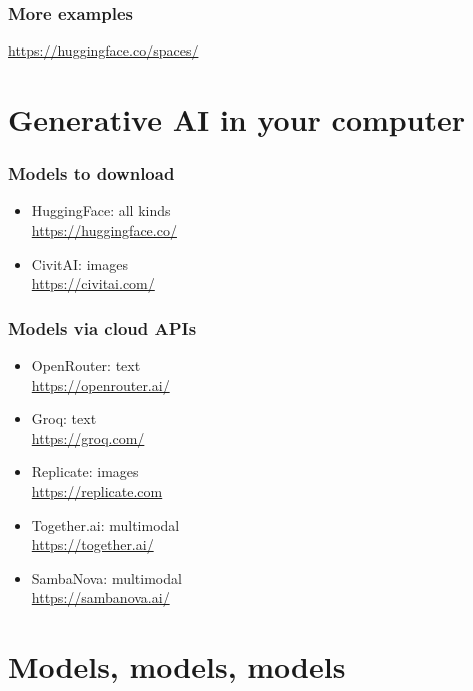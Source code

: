 \documentclass[17pt,aspectratio=169,hyperref={pdfusetitle,colorlinks,allcolors=olive}]{beamer}
\begin{document}
\begin{frame}[fragile]
\frametitle{More examples}

\begin{flushright}
  {
    \url{https://huggingface.co/spaces/}
  }
\end{flushright}
\end{frame}

\section{Generative AI in your computer}

\begin{frame}[fragile]
\frametitle{Models to download}

\begin{itemize}
\item HuggingFace: all kinds \\
  \url{https://huggingface.co/}
\item CivitAI: images \\
  \url{https://civitai.com/}
\end{itemize}
\end{frame}

\begin{frame}[fragile]
\frametitle{Models via cloud APIs}

\begin{itemize}
\item OpenRouter: text \\
  \url{https://openrouter.ai/}
\item Groq: text \\
  \url{https://groq.com/}
\item Replicate: images \\
  \url{https://replicate.com}
\item Together.ai: multimodal \\
  \url{https://together.ai/}
\item SambaNova: multimodal \\
  \url{https://sambanova.ai/}
\end{itemize}
\end{frame}


\section{Models, models, models}
\end{document}
